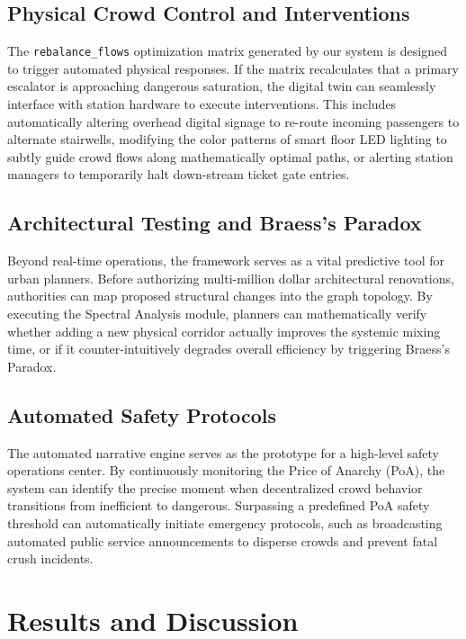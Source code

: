 \documentclass[conference]{IEEEtran}
\begin{document}
\subsection{Physical Crowd Control and Interventions}
The \texttt{rebalance\_flows} optimization matrix generated by our system is designed to trigger automated physical responses. If the matrix recalculates that a primary escalator is approaching dangerous saturation, the digital twin can seamlessly interface with station hardware to execute interventions. This includes automatically altering overhead digital signage to re-route incoming passengers to alternate stairwells, modifying the color patterns of smart floor LED lighting to subtly guide crowd flows along mathematically optimal paths, or alerting station managers to temporarily halt down-stream ticket gate entries.

\subsection{Architectural Testing and Braess's Paradox}
Beyond real-time operations, the framework serves as a vital predictive tool for urban planners. Before authorizing multi-million dollar architectural renovations, authorities can map proposed structural changes into the graph topology. By executing the Spectral Analysis module, planners can mathematically verify whether adding a new physical corridor actually improves the systemic mixing time, or if it counter-intuitively degrades overall efficiency by triggering Braess's Paradox.

\subsection{Automated Safety Protocols}
The automated narrative engine serves as the prototype for a high-level safety operations center. By continuously monitoring the Price of Anarchy (PoA), the system can identify the precise moment when decentralized crowd behavior transitions from inefficient to dangerous. Surpassing a predefined PoA safety threshold can automatically initiate emergency protocols, such as broadcasting automated public service announcements to disperse crowds and prevent fatal crush incidents.

\section{Results and Discussion}
\end{document}
